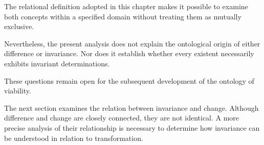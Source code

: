 The relational definition adopted in
this chapter makes it possible to
examine both concepts within a specified
domain without treating them as
mutually exclusive.

Nevertheless, the present analysis
does not explain the ontological origin
of either difference or invariance.
Nor does it establish whether every
existent necessarily exhibits invariant
determinations.

These questions remain open for the
subsequent development of the ontology
of viability.

The next section examines the relation
between invariance and change. Although
difference and change are closely
connected, they are not identical.
A more precise analysis of their
relationship is necessary to determine
how invariance can be understood
in relation to transformation.

